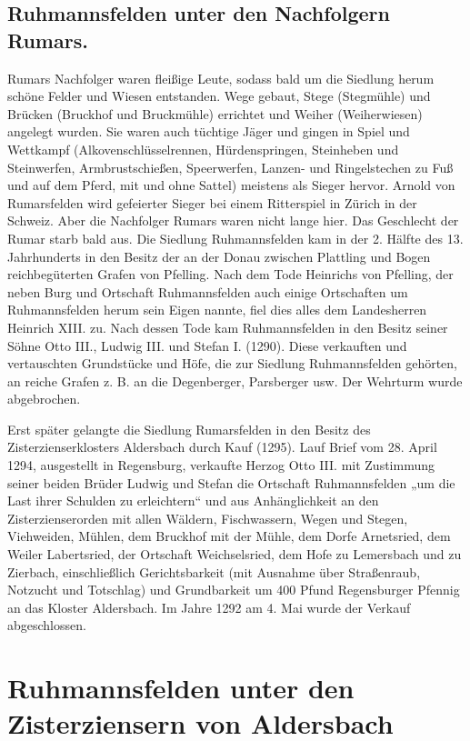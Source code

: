 \documentclass[12pt,a4paper]{book}
\begin{document}
\section[Unter den Nachfolgern Rumars]{Ruhmannsfelden unter den
Nachfolgern Rumars.}

Rumars Nachfolger waren fleißige Leute, sodass bald um die Siedlung
herum schöne Felder und Wiesen entstanden. Wege gebaut, Stege
(Stegmühle) und Brücken (Bruckhof und Bruckmühle) errichtet und Weiher
(Weiherwiesen) angelegt wurden. Sie waren auch tüchtige Jäger und gingen
in Spiel und Wettkampf (Alkovenschlüsselrennen, Hürdenspringen,
Steinheben und Steinwerfen, Armbrustschießen, Speerwerfen, Lanzen- und
Ringelstechen zu Fuß und auf dem Pferd, mit und ohne Sattel) meistens
als Sieger hervor. Arnold von Rumarsfelden wird gefeierter Sieger bei
einem Ritterspiel in Zürich in der Schweiz. Aber die Nachfolger Rumars
waren nicht lange hier. Das Geschlecht der Rumar starb bald aus. Die
Siedlung Ruhmannsfelden kam in der 2. Hälfte des 13. Jahrhunderts in den
Besitz der an der Donau zwischen Plattling und Bogen reichbegüterten
Grafen von Pfelling. Nach dem Tode Heinrichs von Pfelling, der neben
Burg und Ortschaft Ruhmannsfelden auch einige Ortschaften um
Ruhmannsfelden herum sein Eigen nannte, fiel dies alles dem Landesherren
Heinrich XIII. zu. Nach dessen Tode kam Ruhmannsfelden in den Besitz
seiner Söhne Otto III., Ludwig III. und Stefan I. (1290). Diese
verkauften und vertauschten Grundstücke und Höfe, die zur Siedlung
Ruhmannsfelden gehörten, an reiche Grafen z. B. an die Degenberger,
Parsberger usw. Der Wehrturm wurde abgebrochen.

Erst später gelangte die Siedlung Rumarsfelden in den Besitz des
Zisterzienserklosters Aldersbach durch Kauf (1295). Lauf Brief vom 28.
April 1294, ausgestellt in Regensburg, verkaufte Herzog Otto III. mit
Zustimmung seiner beiden Brüder Ludwig und Stefan die Ortschaft
Ruhmannsfelden „um die Last ihrer Schulden zu erleichtern“ und aus
Anhänglichkeit an den Zisterzienserorden mit allen Wäldern,
Fischwassern, Wegen und Stegen, Viehweiden, Mühlen, dem Bruckhof mit der
Mühle, dem Dorfe Arnetsried, dem Weiler Labertsried, der Ortschaft
Weichselsried, dem Hofe zu Lemersbach und zu Zierbach, einschließlich
Gerichtsbarkeit (mit Ausnahme über Straßenraub, Notzucht und Totschlag)
und Grundbarkeit um 400 Pfund Regensburger Pfennig an das Kloster
Aldersbach. Im Jahre 1292 am 4. Mai wurde der Verkauf abgeschlossen.

\chapter[Unter den Zisterziensern]{Ruhmannsfelden unter den
Zisterziensern von Aldersbach}
\end{document}
